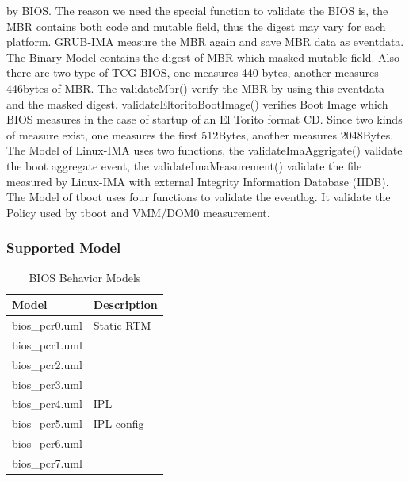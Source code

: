 \documentclass[12pt,a4paper]{article}
\begin{document}
by BIOS. The reason we need the special function to validate the BIOS is, the MBR contains both
code and mutable field, thus the digest may vary for each platform. GRUB-IMA measure the MBR
again and save MBR data as eventdata. The Binary Model contains the digest of MBR which
masked mutable field. Also there are two type of TCG BIOS, one measures 440 bytes, another
measures 446bytes of MBR. The validateMbr() verify the MBR by using this eventdata and the
masked digest. validateEltoritoBootImage() verifies Boot Image which BIOS measures in the case
of startup of an El Torito format CD. Since two kinds of measure exist, one measures the first
512Bytes, another measures 2048Bytes.
    The Model of Linux-IMA uses two functions, the validateImaAggrigate() validate the boot
aggregate event, the validateImaMeasurement() validate the file measured by Linux-IMA with
external Integrity Information Database (IIDB). The Model of tboot uses four functions to validate
the eventlog. It validate the Policy used by tboot and VMM/DOM0 measurement. 


\subsubsection{Supported Model} 


\begin{table}
\caption{BIOS Behavior Models}
\label{table:biosmodel}
\begin{center}
\begin{tabular}{|l|l|}
	\hline
	Model & Description  \\
	\hline 	\hline
	bios\_pcr0.uml &  Static RTM \\
	\hline
	bios\_pcr1.uml &   \\
	\hline
	bios\_pcr2.uml &   \\
	\hline
	bios\_pcr3.uml &   \\
	\hline
	bios\_pcr4.uml &  IPL \\
	\hline
	bios\_pcr5.uml &  IPL config \\
	\hline
	bios\_pcr6.uml &   \\
	\hline
	bios\_pcr7.uml &   \\
	\hline
\end{tabular}
\end{center}
\end{table}
\end{document}
